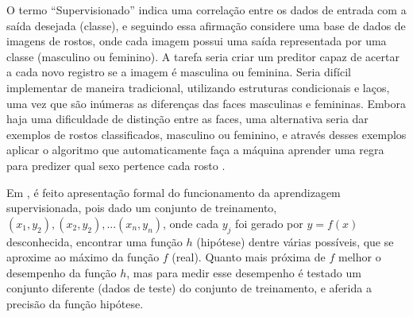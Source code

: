 
O termo ``Supervisionado'' indica uma correlação entre os dados de entrada com a saída desejada (classe), e seguindo essa afirmação considere uma base de dados de imagens de rostos, onde cada imagem possui uma saída representada por uma classe (masculino ou feminino). A tarefa seria criar um preditor capaz de acertar a cada novo registro se a imagem é masculina ou feminina. Seria difícil implementar de maneira tradicional, utilizando estruturas condicionais e laços, uma vez que são inúmeras as diferenças das faces masculinas e femininas. Embora haja uma dificuldade de distinção entre as faces, uma alternativa seria dar exemplos de rostos classificados, masculino ou feminino,  e através desses exemplos aplicar o algoritmo que automaticamente faça a máquina aprender uma regra para predizer qual sexo pertence cada rosto  \cite{Barber2011}.

Em , é feito apresentação formal do funcionamento da aprendizagem supervisionada, pois dado um conjunto de treinamento, 
${(x_{1},y_{2}),(x_{2},y_{2}),...(x_{n},y_{n})}$, onde cada ${y_{j}} $ foi gerado por ${y=f(x)}$ desconhecida, encontrar uma função ${h}$ (hipótese) dentre várias possíveis, que se aproxime ao máximo da função ${f}$ (real). Quanto mais próxima de ${f}$ melhor o desempenho da função ${h}$, mas para medir esse desempenho é testado um conjunto diferente (dados de teste) do conjunto de treinamento, e aferida a precisão da função hipótese.  

